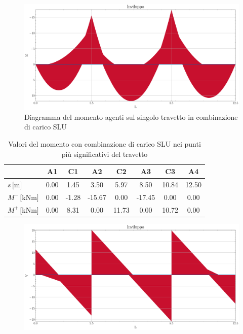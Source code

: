 \begin{landscape}
\begin{figure}[H]
\centering
\includegraphics[height=0.6\textwidth]{IMG/diagrammi_solaio/ULS_M_travetto.pdf}
\caption{Diagramma del momento agenti sul singolo travetto in combinazione di carico SLU}
\label{fig:solaio_ULS_momento}
\end{figure}
\begin{table}[H]
\footnotesize
\centering
\caption{Valori del momento con combinazione di carico SLU nei punti più significativi del travetto}
\label{tab:solaio_ULS_momento}
	\begin{tabular}{lS[table-format=-3.2]S[table-format=-3.2]S[table-format=-3.2]S[table-format=-3.2]S[table-format=-3.2]S[table-format=-3.2]S[table-format=-3.2]}
		\toprule
		{} & {A1} & {C1} & {A2} & {C2} & {A3} & {C3} & {A4} \\
		\midrule
		$s\,\si{[\metre]}$  				& 0.00 & 1.45 	& 3.50 		& 5.97 & 8.50 & 10.84 & 12.50 \\
        $M^{-}\,\si{[\kilo\newton\metre]}$ 	& 0.00 & -1.28 	& -15.67 	& 0.00 & -17.45 & 0.00 & 0.00 \\
        $M^{+}\,\si{[\kilo\newton\metre]}$ 	& 0.00 & 8.31 	& 0.00 		& 11.73 & 0.00 & 10.72 & 0.00 \\
		\bottomrule
	\end{tabular}
\end{table}
\clearpage
\begin{figure}[H]
	\centering
	\includegraphics[height=0.6\textwidth]{IMG/diagrammi_solaio/ULS_V_travetto.pdf}

\end{figure}
\end{landscape}
